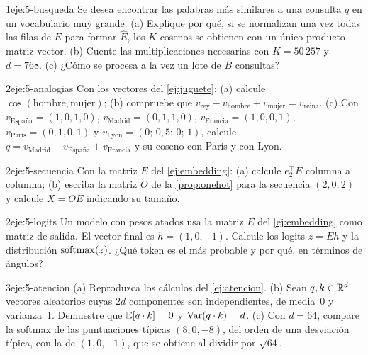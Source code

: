 \begin{ejercicio}{1}{eje:5-busqueda}
Se desea encontrar las palabras más similares a una consulta $q$ en un vocabulario muy grande. (a) Explique por qué, si se normalizan una vez todas las filas de $E$ para formar $\hat E$, los $K$ cosenos se obtienen con un único producto matriz-vector. (b) Cuente las multiplicaciones necesarias con $K=50\,257$ y $d=768$. (c) ¿Cómo se procesa a la vez un lote de $B$ consultas?
\end{ejercicio}

\begin{ejercicio}{2}{eje:5-analogias}
Con los vectores del \cref{ej:juguete}: (a) calcule $\cos(\text{hombre},\text{mujer})$; (b) compruebe que $v_{\text{rey}}-v_{\text{hombre}}+v_{\text{mujer}}=v_{\text{reina}}$. (c) Con $v_{\text{España}}=(1,0,1,0)$, $v_{\text{Madrid}}=(0,1,1,0)$, $v_{\text{Francia}}=(1,0,0,1)$, $v_{\text{París}}=(0,1,0,1)$ y $v_{\text{Lyon}}=(0;\,0{,}5;\,0;\,1)$, calcule $q=v_{\text{Madrid}}-v_{\text{España}}+v_{\text{Francia}}$ y su coseno con París y con Lyon.
\end{ejercicio}

\begin{ejercicio}{2}{eje:5-secuencia}
Con la matriz $E$ del \cref{ej:embedding}: (a) calcule $e_2^{\top}E$ columna a columna; (b) escriba la matriz $O$ de la \cref{prop:onehot} para la secuencia $(2,0,2)$ y calcule $X=OE$ indicando su tamaño.
\end{ejercicio}

\begin{ejercicio}{2}{eje:5-logits}
Un modelo con pesos atados usa la matriz $E$ del \cref{ej:embedding} como matriz de salida. El vector final es $h=(1,0,-1)$. Calcule los logits $z=Eh$ y la distribución $\operatorname{softmax}(z)$. ¿Qué token es el más probable y por qué, en términos de ángulos?
\end{ejercicio}

\begin{ejercicio}{3}{eje:5-atencion}
(a) Reproduzca los cálculos del \cref{ej:atencion}. (b) Sean $q,k\in\mathbb{R}^{d}$ vectores aleatorios cuyas $2d$ componentes son independientes, de media~0 y varianza~1. Demuestre que $\mathbb{E}[q\cdot k]=0$ y $\operatorname{Var}(q\cdot k)=d$. (c) Con $d=64$, compare la softmax de las puntuaciones típicas $(8,0,-8)$, del orden de una desviación típica, con la de $(1,0,-1)$, que se obtiene al dividir por $\sqrt{64}$.
\end{ejercicio}
